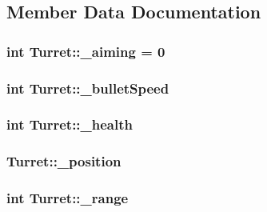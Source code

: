 \subsection{Member Data Documentation}
\subsubsection[{\texorpdfstring{\+\_\+aiming}{_aiming}}]{\setlength{\rightskip}{0pt plus 5cm}int Turret\+::\+\_\+aiming = 0}\hypertarget{class_turret_a359ea4b0d1eb06880d0971dbc1c77c60}{}\label{class_turret_a359ea4b0d1eb06880d0971dbc1c77c60}
\subsubsection[{\texorpdfstring{\+\_\+bullet\+Speed}{_bulletSpeed}}]{\setlength{\rightskip}{0pt plus 5cm}int Turret\+::\+\_\+bullet\+Speed}\hypertarget{class_turret_a5c5b20c2a2e56f4ced002b7d79be0b25}{}\label{class_turret_a5c5b20c2a2e56f4ced002b7d79be0b25}
\subsubsection[{\texorpdfstring{\+\_\+health}{_health}}]{\setlength{\rightskip}{0pt plus 5cm}int Turret\+::\+\_\+health}\hypertarget{class_turret_ab2bf5de8417b19dd7d78f29ce041a16a}{}\label{class_turret_ab2bf5de8417b19dd7d78f29ce041a16a}
\subsubsection[{\texorpdfstring{\+\_\+position}{_position}}]{ Turret\+::\+\_\+position}\hypertarget{class_turret_a0ef0ca5baa391a6874f97b6b3e440432}{}\label{class_turret_a0ef0ca5baa391a6874f97b6b3e440432}
\subsubsection[{\texorpdfstring{\+\_\+range}{_range}}]{\setlength{\rightskip}{0pt plus 5cm}int Turret\+::\+\_\+range}\hypertarget{class_turret_ae0343faa95df71e2a8bf7269e617fc72}{}\label{class_turret_ae0343faa95df71e2a8bf7269e617fc72}
